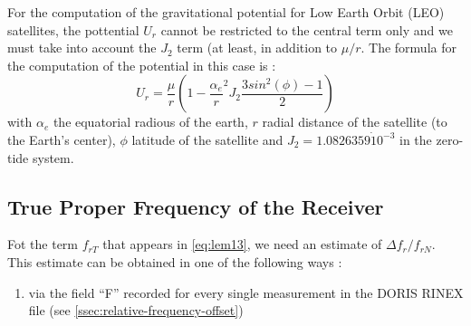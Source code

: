 For the computation of the gravitational potential for Low Earth Orbit (LEO) satellites, 
the pottential \(U_r\) cannot be restricted to the central term only and we must 
take into account the \(J_2\) term (at least, in addition to \(\mu / r\). The formula 
for the computation of the potential in this case is \cite{lemoine-2016}:
\begin{equation}
    U_r = \frac{\mu}{r} (1-{\frac{\alpha_e}{r}}^2 J_2 \frac{3 sin^2(\phi) - 1}{2})
\end{equation}
with \(\alpha_e\) the equatorial radious of the earth, \(r\) radial distance of the 
satellite (to the Earth's center), \(\phi\) latitude of the satellite and \(J_2 = 1.0826359 \dot 10^{-3}\) 
in the zero-tide system.

\subsection{True Proper Frequency of the Receiver}
\label{ssec:true-proprtfrequency-of-the-receiver}

Fot the term \(f_{rT}\) that appears in \ref{eq:lem13}, we need an estimate of \(\Delta f_{r} / f_{rN}\). 
This estimate can be obtained in one of the following ways \cite{lemoine-2012}:
\begin{enumerate}
    \item via the field ``F'' recorded for every single measurement in the DORIS RINEX file (see \ref{ssec:relative-frequency-offset})
\end{enumerate}